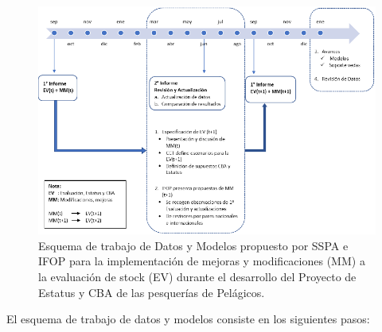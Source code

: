 \documentclass[
  spanish,
]{article}
\begin{document}
\begin{figure}[h!]
\centering
\includegraphics[width=1\textwidth]{Figuras/EsquemaTrabajo.pdf}
\caption{Esquema de trabajo de Datos y Modelos propuesto por SSPA e IFOP para la implementación de mejoras y modificaciones (MM) a la evaluación de stock (EV) durante el desarrollo del Proyecto de Estatus y CBA de las pesquerías de Pelágicos.}
\label{Fig17}
\end{figure}

\vspace{0.5cm}

El esquema de trabajo de datos y modelos consiste en los siguientes
pasos:
\end{document}
